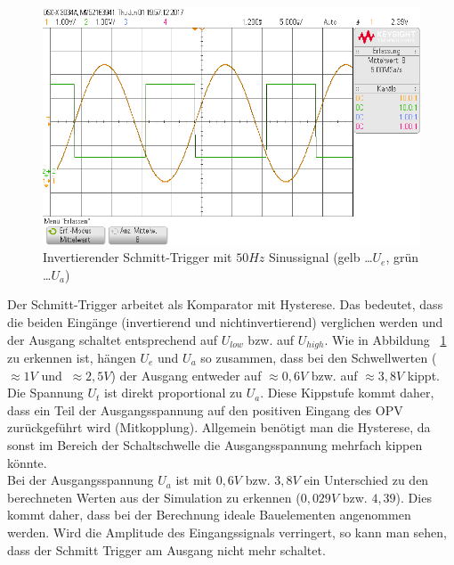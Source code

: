 \documentclass[12pt,a4paper,titlepage]{article}
\begin{document}
\begin{figure}[H]
  \centering
  \includegraphics[width=150mm]{i_schmitt_trigger_sinus.png}
  \caption{Invertierender Schmitt-Trigger mit $50Hz$ Sinussignal (gelb \dots $U_e$, gr\"un \dots $U_a$)}
  \label{figure43}
\end{figure}
\noindent Der Schmitt-Trigger arbeitet als Komparator mit Hysterese. Das bedeutet, dass die beiden Eing\"ange (invertierend und nichtinvertierend) verglichen werden und der Ausgang schaltet entsprechend auf $U_{low}$ bzw. auf $U_{high}$. Wie in Abbildung ~\ref{figure43} zu erkennen ist, h\"angen $U_e$ und $U_a$ so zusammen, dass bei den Schwellwerten ($\approx 1V$ und $~\approx 2,5V$) der Ausgang entweder auf $\approx 0,6V$ bzw. auf $\approx 3,8V$ kippt. Die Spannung $U_t$ ist direkt proportional zu $U_a$. Diese Kippstufe kommt daher, dass ein Teil der Ausgangsspannung auf den positiven Eingang des OPV zur\"uckgef\"uhrt wird (Mitkopplung). Allgemein ben\"otigt man die Hysterese, da sonst im Bereich der Schaltschwelle die Ausgangsspannung mehrfach kippen k\"onnte.\\
Bei der Ausgangsspannung $U_a$ ist mit $0,6V$ bzw. $3,8V$ ein Unterschied zu den berechneten Werten aus der Simulation zu erkennen ($0,029V$ bzw. $4,39$). Dies kommt daher, dass bei der Berechnung ideale Bauelementen angenommen werden. Wird die Amplitude des Eingangssignals verringert, so kann man sehen, dass der Schmitt Trigger am Ausgang nicht mehr schaltet.
\end{document}
